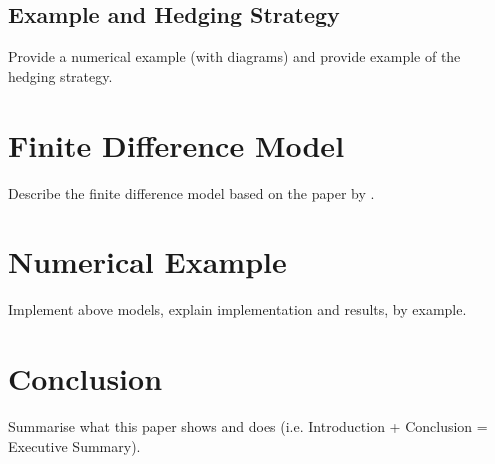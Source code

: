 \documentclass[a4paper,11pt,oneside]{report}
\newcommand{\setlinespacing}[1]
           {\renewcommand{\baselinestretch}{#1}\small\normalsize}
\theoremstyle{plain}
\theoremstyle{definition}
\begin{document}
\section{Example and Hedging Strategy}
Provide a numerical example (with diagrams) and provide example of the hedging strategy.

\chapter{Finite Difference Model}
Describe the finite difference model based on the paper by \citet{AFV03}.

\chapter{Numerical Example}
Implement above models, explain implementation and results, by example.

\chapter{Conclusion}
Summarise what this paper shows and does (i.e. Introduction + Conclusion = Executive Summary).


\clearpage
\setlinespacing{1}


\end{document}

